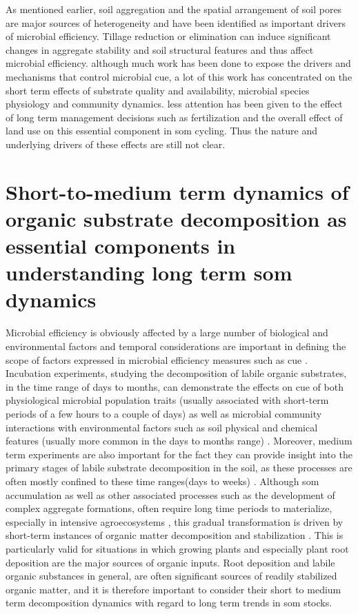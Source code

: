 		As mentioned earlier, soil aggregation and the spatial arrangement of soil pores are major sources of heterogeneity and have been identified as important drivers of microbial efficiency\citep{kravchenko2019}.
		Tillage reduction or elimination can induce significant changes in aggregate stability and soil structural features \citep{alvaro-fuentes2009, barreto2009a} and thus affect microbial efficiency.
		although much work has been done to expose the drivers and mechanisms that control microbial \gls{cue}, a lot of this work has concentrated on the short term effects of substrate quality and availability, microbial species physiology and community dynamics. less attention has been given to the effect of long term management decisions such as fertilization and the overall effect of land use on this essential component in \gls{som} cycling. Thus the nature and underlying drivers of these effects are still not clear.

\section{Short-to-medium term dynamics of organic substrate decomposition as essential components in understanding long term \gls{som} dynamics}

		Microbial efficiency is obviously affected by a large number of biological and environmental factors and temporal considerations are important in defining the scope of factors expressed in microbial efficiency measures such as \gls{cue} \citep{kallenbach2019}. Incubation experiments, studying the decomposition of labile organic substrates, in the time range of days to months,  can demonstrate the effects on \gls{cue} of both physiological microbial population traits (usually associated with short-term periods of a few hours to a couple of days) as well as microbial community interactions with environmental factors such as soil physical and chemical features (usually more common in the days to months range) \citep{geyer2016, manzoni2018}. Moreover, medium term experiments are also important for the fact they can provide insight into the primary stages of labile substrate decomposition in the soil, as these processes are often mostly confined to these time ranges(days to weeks) \citep{blagodatskaya2011, schneckenberger2008, tian2015}. Although \gls{som} accumulation as well as other associated processes such as the development of complex aggregate formations, often require long time periods to materialize, especially in intensive agroecosystems \citep{grandy2007}, this gradual transformation is driven by short-term instances of organic matter decomposition and stabilization \citep{kuzyakov2015}. This is particularly valid for situations in which growing plants and especially plant root deposition are the major sources of organic inputs. Root deposition and labile organic substances in general, are often significant sources of readily stabilized organic matter, and it is therefore important to consider their short to medium term decomposition dynamics with regard to long term trends in \gls{som} stocks.

